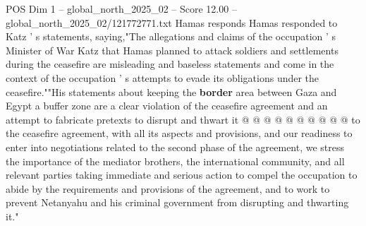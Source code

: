 \begin{textsample}{POS Dim 1 – global\_north\_2025\_02 – Score 12.00 – global\_north\_2025\_02/121772771.txt}
Hamas responds Hamas responded to Katz ' s statements, saying,"The allegations and claims of the occupation ' s Minister of War Katz that Hamas planned to attack soldiers and settlements during the ceasefire are misleading and baseless statements and come in the context of the occupation ' s attempts to evade its obligations under the ceasefire.""His statements about keeping the \textbf{border} area between Gaza and Egypt a buffer zone are a clear violation of the ceasefire agreement and an attempt to fabricate pretexts to disrupt and thwart it @ @ @ @ @ @ @ @ @ @ to the ceasefire agreement, with all its aspects and provisions, and our readiness to enter into negotiations related to the second phase of the agreement, we stress the importance of the mediator brothers, the international community, and all relevant parties taking immediate and serious action to compel the occupation to abide by the requirements and provisions of the agreement, and to work to prevent Netanyahu and his criminal government from disrupting and thwarting it."

\end{textsample}
